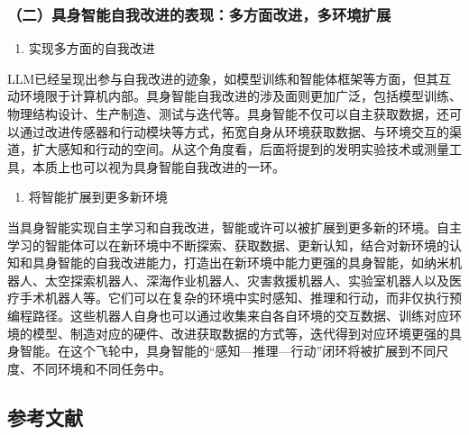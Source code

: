 \hypertarget{ux4e8cux5177ux8eabux667aux80fdux81eaux6211ux6539ux8fdbux7684ux8868ux73b0ux591aux65b9ux9762ux6539ux8fdbux591aux73afux5883ux6269ux5c55}{%
\subsubsection{（二）具身智能自我改进的表现：多方面改进，多环境扩展}\label{ux4e8cux5177ux8eabux667aux80fdux81eaux6211ux6539ux8fdbux7684ux8868ux73b0ux591aux65b9ux9762ux6539ux8fdbux591aux73afux5883ux6269ux5c55}}

\begin{enumerate}
\def\labelenumi{\arabic{enumi}.}
\tightlist
\item
  实现多方面的自我改进
\end{enumerate}

LLM已经呈现出参与自我改进的迹象，如模型训练和智能体框架等方面，但其互动环境限于计算机内部。具身智能自我改进的涉及面则更加广泛，包括模型训练、物理结构设计、生产制造、测试与迭代等。具身智能不仅可以自主获取数据，还可以通过改进传感器和行动模块等方式，拓宽自身从环境获取数据、与环境交互的渠道，扩大感知和行动的空间。从这个角度看，后面将提到的发明实验技术或测量工具，本质上也可以视为具身智能自我改进的一环。

\begin{enumerate}
\def\labelenumi{\arabic{enumi}.}
\setcounter{enumi}{1}
\tightlist
\item
  将智能扩展到更多新环境
\end{enumerate}

当具身智能实现自主学习和自我改进，智能或许可以被扩展到更多新的环境。自主学习的智能体可以在新环境中不断探索、获取数据、更新认知，结合对新环境的认知和具身智能的自我改进能力，打造出在新环境中能力更强的具身智能，如纳米机器人、太空探索机器人、深海作业机器人、灾害救援机器人、实验室机器人以及医疗手术机器人等。它们可以在复杂的环境中实时感知、推理和行动，而非仅执行预编程路径。这些机器人自身也可以通过收集来自各自环境的交互数据、训练对应环境的模型、制造对应的硬件、改进获取数据的方式等，迭代得到对应环境更强的具身智能。在这个飞轮中，具身智能的``感知---推理---行动''闭环将被扩展到不同尺度、不同环境和不同任务中。

\hypertarget{ux53c2ux8003ux6587ux732e-166}{%
\subsection{参考文献}\label{ux53c2ux8003ux6587ux732e-166}}

